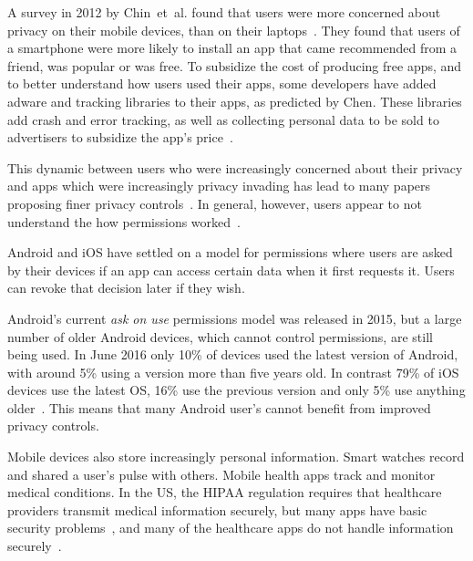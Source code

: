 \documentclass[thesis.tex]{subfiles}
\begin{document}
A survey in 2012 by Chin~et~al{.} found that users were more concerned about
privacy on their mobile devices, than on their
laptops~\cite{chin_measuring_2012}. They found that users of a smartphone were
more likely to install an app that came recommended from a friend, was popular
or was free. To subsidize the cost of producing free apps, and to better
understand how users used their apps, some developers have added adware and
tracking libraries to their apps, as predicted by Chen. These libraries add
crash and error tracking, as well as collecting personal data to be sold to
advertisers to subsidize the app's price~\cite{seungyeop_han_study_2012}.

This dynamic between users who were increasingly concerned about their
privacy and apps which were increasingly privacy invading has lead to many papers proposing finer privacy
controls~\cite{jeon_dr._2012,beresford_mockdroid:_2011,conti_crepe:_2010,backes_appguard_2013}.  
In general, however, users appear to not understand the how permissions worked~\cite{felt_android_2012}. 

Android and iOS have settled on a model for permissions where users are asked by their
devices if an app can access certain data when it first requests it.
Users can revoke that decision later if they wish.

Android's current \emph{ask on use} permissions model was released in 2015, but
a large number of older Android devices, which cannot control permissions, are
still being used. In June 2016 only 10\% of devices used the latest version of
Android, with around 5\% using a version more than five years old. In contrast 79\% of iOS devices use the latest
OS, 16\% use the previous version and only 5\% use anything
older~\cite{apple_app_2017}. This means that many Android user's cannot benefit
from improved privacy controls.


Mobile devices also store increasingly personal information. Smart watches
record and shared a user's pulse with others. Mobile health apps track and
monitor medical conditions. In the US, the \ac{HIPAA} regulation requires that
healthcare providers transmit medical information securely, but many apps have
basic security problems~\cite{fahl_why_2012}, and many of the healthcare apps
do not handle information securely~\cite{knorr_privacy_2015}.
\end{document}
